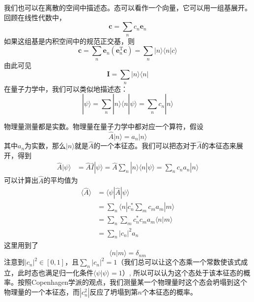 \documentclass[12pt]{article}
\begin{document}
我们也可以在离散的空间中描述态。态可以看作一个向量，它可以用一组基展开。回顾在线性代数中，
\begin{equation*}
    \bm{c} = \sum_n c_n \bm{e}_n
\end{equation*}
如果这组基是内积空间中的规范正交基，则
\begin{equation*}
    \bm{c} = \sum_n \bm{e}_n (\bm{e}_n^\mathrm{T}\bm{c}) 
    = \sum_n |n\rangle \langle n|c\rangle
\end{equation*}
由此可见
\begin{equation*}
    \bm{I} = \sum_n |n\rangle \langle n|
\end{equation*}
在量子力学中，我们可以类似地描述态：
\begin{equation*}
    |\psi \rangle = \sum_n |n\rangle \langle n|\psi \rangle = \sum_n c_n |n\rangle
\end{equation*}

物理量测量都是实数。物理量在量子力学中都对应一个算符，假设
\begin{equation*}
    \hat{A} |n\rangle = a_n |n\rangle
\end{equation*}
其中$a_n$为实数，那么$|n\rangle$就是$\hat{A}$的一个本征态。我们可以把态对于$\hat{A}$的本征态来展开，得到
\begin{align*}
    \hat{A}|\psi \rangle &= \hat{A}\hat{I}|\psi \rangle
    = \hat{A} \sum_n |n\rangle \langle n|\psi\rangle
    = \sum_n c_n a_n |n\rangle
\end{align*}
可以计算出$\hat{A}$的平均值为
\begin{align*}
    \langle \hat{A} \rangle &= \langle \psi |\hat{A}| \psi \rangle\\
    &= \sum_n \langle n| c_n^* \sum_m c_m a_m |m\rangle\\
    &= \sum_n \sum_m c_n^* c_m a_m \langle n|m\rangle\\
    &= \sum_n |c_n|^2 a_n
\end{align*}
这里用到了
\[\langle n | m \rangle = \delta_{nm}\]
注意到$|c_n|^2 \in [0,1]$，且$\sum_n |c_n|^2 = 1$（我们总可以让这个态乘一个常数使该式成立，此时态也满足归一化条件$\langle \psi |\psi \rangle = 1$）, 所以可以认为这个态处于该本征态的概率。按照Copenhagen学派的观点，我们测量某一个物理量时这个态会坍塌到这个物理量的一个本征态，而$|c_n^2|$反应了坍塌到第$n$个本征态的概率。
\end{document}
